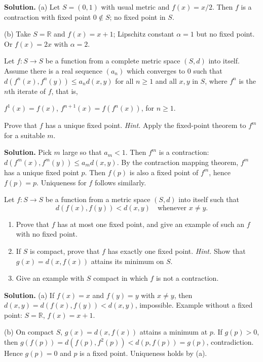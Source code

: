 \noindent\textbf{Solution.}
(a) Let $S=(0,1)$ with usual metric and $f(x)=x/2$. Then $f$ is a contraction with fixed point $0\notin S$; no fixed point in $S$.

(b) Take $S=\mathbb{R}$ and $f(x)=x+1$; Lipschitz constant $\alpha=1$ but no fixed point. Or $f(x)=2x$ with $\alpha=2$.
\medskip

\begin{problembox}
Let $f: S \to S$ be a function from a complete metric space $(S, d)$ into itself. Assume there is a real sequence $(a_n)$ which converges to $0$ such that $d(f^n(x), f^n(y)) \le a_n d(x, y)$ for all $n \ge 1$ and all $x, y$ in $S$, where $f^n$ is the $n$th iterate of $f$, that is, 

$f^1(x) = f(x)$, $f^{n+1}(x) = f(f^n(x))$, for $n \ge 1$. 

Prove that $f$ has a unique fixed point. \textit{Hint.} Apply the fixed-point theorem to $f^m$ for a suitable $m$.
\end{problembox}

\noindent\textbf{Solution.}
Pick $m$ large so that $a_m<1$. Then $f^m$ is a contraction: $d(f^m(x),f^m(y))\le a_m d(x,y)$. By the contraction mapping theorem, $f^m$ has a unique fixed point $p$. Then $f(p)$ is also a fixed point of $f^m$, hence $f(p)=p$. Uniqueness for $f$ follows similarly.
\medskip

\begin{problembox}
Let $f: S \to S$ be a function from a metric space $(S, d)$ into itself such that
\[ d(f(x), f(y)) < d(x, y) \quad \text{whenever } x \neq y. \]
\begin{enumerate}[label=(\alph*)]
\item Prove that $f$ has at most one fixed point, and give an example of such an $f$ with no fixed point.
\item If $S$ is compact, prove that $f$ has exactly one fixed point. \textit{Hint.} Show that $g(x) = d(x, f(x))$ attains its minimum on $S$.
\item Give an example with $S$ compact in which $f$ is not a contraction.
\end{enumerate}
\end{problembox}

\noindent\textbf{Solution.}
(a) If $f(x)=x$ and $f(y)=y$ with $x\ne y$, then $d(x,y)=d(f(x),f(y))<d(x,y)$, impossible. Example without a fixed point: $S=\mathbb{R}$, $f(x)=x+1$.

(b) On compact $S$, $g(x)=d(x,f(x))$ attains a minimum at $p$. If $g(p)>0$, then $g(f(p))=d(f(p),f^2(p))<d(p,f(p))=g(p)$, contradiction. Hence $g(p)=0$ and $p$ is a fixed point. Uniqueness holds by (a).

